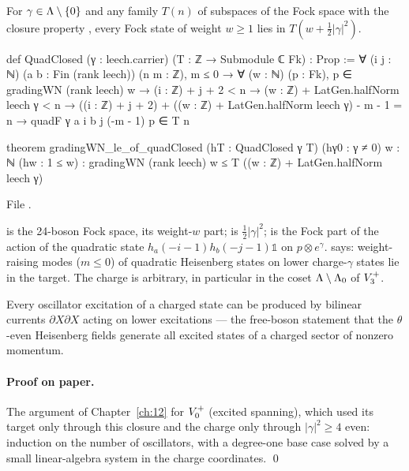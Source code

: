 \begin{theorem}\label{ch14:thm:excited}
For $\gamma\in{\Lambda}\setminus\{0\}$ and any family $T(n)$ of subspaces of the Fock space with the closure
property , every Fock state of weight $w\ge1$ lies in $T(w+\tfrac12|\gamma|^2)$.
\end{theorem}
\begin{leancode}
def QuadClosed (γ : leech.carrier) (T : ℤ → Submodule ℂ Fk) : Prop :=
  ∀ (i j : ℕ) (a b : Fin (rank leech)) (n m : ℤ), m ≤ 0 → ∀ (w : ℕ) (p : Fk),
    p ∈ gradingWN (rank leech) w → (i : ℤ) + j + 2 < n → (w : ℤ) + LatGen.halfNorm leech γ < n →
    ((i : ℤ) + j + 2) + ((w : ℤ) + LatGen.halfNorm leech γ) - m - 1 = n →
    quadF γ a i b j (-m - 1) p ∈ T n

theorem gradingWN_le_of_quadClosed (hT : QuadClosed γ T) (hγ0 : γ ≠ 0) {w : ℕ} (hw : 1 ≤ w) :
    gradingWN (rank leech) w ≤ T ((w : ℤ) + LatGen.halfNorm leech γ)
\end{leancode}
File .

\begin{dictionary}
 is the 24-boson Fock space,  its weight-$w$ part;  is
$\tfrac12|\gamma|^2$;  is the Fock part of the action of the quadratic state
$h_a(-i-1)h_b(-j-1)\mathbb 1$ on $p\otimes e^\gamma$.   says: weight-raising modes ($m\le0$) of
quadratic Heisenberg states on lower charge-$\gamma$ states lie in the target.  The charge is arbitrary,
in particular in the coset ${\Lambda}\setminus{\Lambda}_0$ of $V_3^{+}$.
\end{dictionary}

\begin{physics}
Every oscillator excitation of a charged state can be produced by bilinear currents $\partial X\partial X$
acting on lower excitations — the free-boson statement that the $\theta$-even Heisenberg fields generate
all excited states of a charged sector of nonzero momentum.
\end{physics}

\paragraph{Proof on paper.}  The argument of Chapter~\ref{ch:12} for $V_0^{+}$ (excited spanning), which used
its target only through this closure and the charge only through $|\gamma|^2\ge4$ even: induction on the
number of oscillators, with a degree-one base case solved by a small linear-algebra system in the
charge coordinates. \qed

